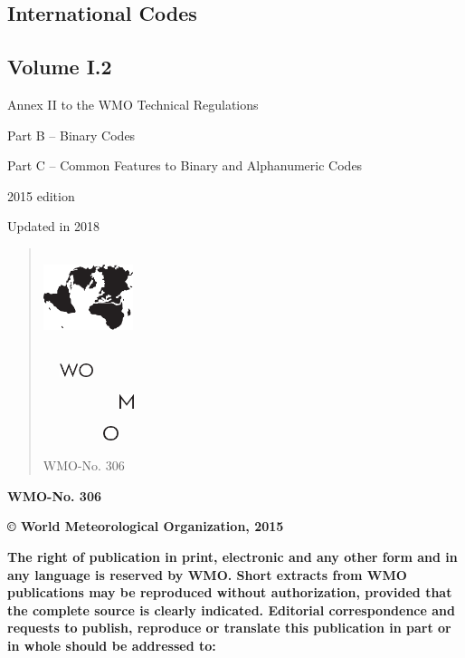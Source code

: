 \hypertarget{international-codes-1}{%
\subsection{International Codes }\label{international-codes-1}}

\hypertarget{volume-i.2-1}{%
\subsection{Volume I.2}\label{volume-i.2-1}}

Annex II to the WMO Technical Regulations

Part B -- Binary Codes

Part C -- Common Features to Binary and Alphanumeric Codes

2015 edition

Updated in 2018

\begin{quote}
\includegraphics[width=1.02986in,height=1.12778in]{../tex/extracted-media/media/image37.png}

\includegraphics[width=0.77014in,height=0.16042in]{../tex/extracted-media/media/image45.png}

\includegraphics[width=1.92569in,height=0.16806in]{../tex/extracted-media/media/image51.png}

\includegraphics[width=1.55556in,height=0.16736in]{../tex/extracted-media/media/image63.png}

WMO-No. 306
\end{quote}

\textbf{WMO-No. 306}

\textbf{© World Meteorological Organization, 2015}

\textbf{The right of publication in print, electronic and any other form and in any language is reserved by WMO. Short extracts from WMO publications may be reproduced without authorization, provided that the complete source is clearly indicated. Editorial correspondence and requests to publish, reproduce or translate this publication in part or in whole should be addressed to:}

